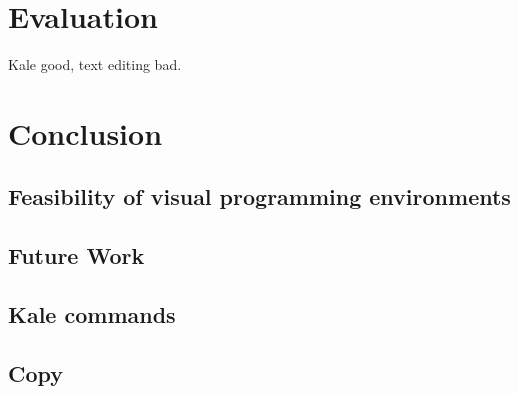 \documentclass[11pt]{report}
\begin{document}
\chapter{Evaluation}

Kale good, text editing bad.

\chapter{Conclusion}

\section{Feasibility of visual programming environments}

\section{Future Work}

\endgroup %
\clearpage
\renewcommand*{\bibfont}{\raggedright} %


\begin{appendices}
\chapter{Kale commands}

\section{Copy}


\end{appendices}
\end{document}
